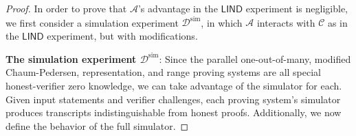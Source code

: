 \documentclass{llncs}
\newcommand{\func}[1]{\mathsf{#1}}
\begin{document}
\begin{proof}
In order to prove that $\mathcal{A}$'s advantage in the $\func{LIND}$ experiment is negligible, we first consider a simulation experiment $\mathcal{D}^{\text{sim}}$, in which $\mathcal{A}$ interacts with $\mathcal{C}$ as in the $\func{LIND}$ experiment, but with modifications.

\textbf{The simulation experiment $\mathcal{D}^{\text{sim}}$}: Since the parallel one-out-of-many, modified Chaum-Pedersen, representation, and range proving systems are all special honest-verifier zero knowledge, we can take advantage of the simulator for each.
Given input statements and verifier challenges, each proving system's simulator produces transcripts indistinguishable from honest proofs.
Additionally, we now define the behavior of the full simulator.


\end{proof}
\end{document}
